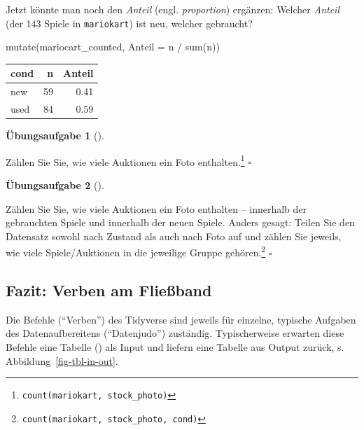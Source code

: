 \documentclass[
  letterpaper,
]{scrbook}
\newenvironment{Shaded}{\begin{snugshade}}{\end{snugshade}}
\newcommand{\AttributeTok}[1]{\textcolor[rgb]{0.40,0.45,0.13}{#1}}
\newcommand{\FunctionTok}[1]{\textcolor[rgb]{0.28,0.35,0.67}{#1}}
\newcommand{\NormalTok}[1]{\textcolor[rgb]{0.00,0.23,0.31}{#1}}
\newcommand{\SpecialCharTok}[1]{\textcolor[rgb]{0.37,0.37,0.37}{#1}}
\theoremstyle{definition}
\newtheorem{exercise}{Übungsaufgabe}[chapter]
\theoremstyle{definition}
\theoremstyle{definition}
\theoremstyle{remark}
\begin{document}
Jetzt könnte man noch den \emph{Anteil} (engl. \emph{proportion})
ergänzen: Welcher \emph{Anteil} (der 143 Spiele in \texttt{mariokart})
ist neu, welcher gebraucht?

\begin{Shaded}
\begin{Highlighting}[]
\FunctionTok{mutate}\NormalTok{(mariocart\_counted, }\AttributeTok{Anteil =}\NormalTok{ n }\SpecialCharTok{/} \FunctionTok{sum}\NormalTok{(n))}
\end{Highlighting}
\end{Shaded}

\begin{longtable}[]{@{}lrr@{}}
\toprule\noalign{}
cond & n & Anteil \\
\midrule\noalign{}
\endhead
\bottomrule\noalign{}
\endlastfoot
new & 59 & 0.41 \\
used & 84 & 0.59 \\
\end{longtable}

\begin{exercise}[]\protect\hypertarget{exr-count}{}\label{exr-count}

Zählen Sie Sie, wie viele Auktionen ein Foto enthalten.\footnote{\texttt{count(mariokart,\ stock\_photo)}}
\(\square\)

\end{exercise}

\begin{exercise}[]\protect\hypertarget{exr-count2}{}\label{exr-count2}

Zählen Sie Sie, wie viele Auktionen ein Foto enthalten -- innerhalb der
gebrauchten Spiele und innerhalb der neuen Spiele. Anders gesagt: Teilen
Sie den Datensatz sowohl nach Zustand als auch nach Foto auf und zählen
Sie jeweils, wie viele Spiele/Auktionen in die jeweilige Gruppe
gehören.\footnote{\texttt{count(mariokart,\ stock\_photo,\ cond)}}
\(\square\)

\end{exercise}

\subsection{Fazit: Verben am
Fließband}\label{fazit-verben-am-flieuxdfband}

Die Befehle (\enquote{Verben}) des Tidyverse sind jeweils für einzelne,
typische Aufgaben des Datenaufbereitens (\enquote{Datenjudo}) zuständig.
Typischerweise erwarten diese Befehle eine Tabelle () als
Input und liefern eine Tabelle aus Output zurück, s.
Abbildung~\ref{fig-tbl-in-out}.
\end{document}
